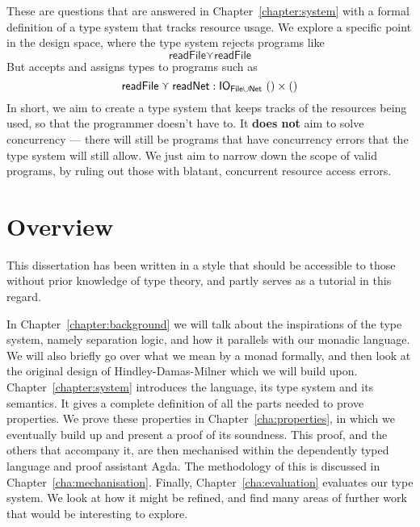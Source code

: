 \documentclass{report}
\begin{document}
These are questions that are answered in Chapter~\ref{chapter:system} with a
formal definition of a type system that tracks resource usage. We explore a
specific point in the design space, where the type system rejects programs like
\[
\textsf{readFile} \curlyvee \textsf{readFile}
\]
But accepts and assigns types to programs such as
\[
\textsf{readFile} \curlyvee \textsf{readNet} : \mathsf{IO}_{\textsf{File} \cup \textsf{Net}} \ () \times ()
\]
In short, we aim to create a type system that keeps tracks of the resources
being used, so that the programmer doesn't have to. It \textbf{does not} aim to
solve concurrency --- there will still be programs that have concurrency errors
that the type system will still allow. We just aim to narrow down the scope of
valid programs, by ruling out those with blatant, concurrent resource access
errors. 

\section{Overview}

This dissertation has been written in a style that should be accessible to those
without prior knowledge of type theory, and partly serves as a tutorial in this
regard.

In Chapter~\ref{chapter:background} we will talk about the inspirations of the
type system, namely separation logic, and how it parallels with our monadic
language. We will also briefly go over what we mean by a monad formally, and
then look at the original design of Hindley-Damas-Milner which we will build
upon.
Chapter~\ref{chapter:system} introduces the language, its type system and its
semantics.  It gives a complete definition of all the parts needed to prove
properties.  We prove these properties in Chapter~\ref{cha:properties}, in which
we eventually build up and present a proof of its soundness. This proof, and the
others that accompany it, are then mechanised within the dependently typed
language and proof assistant Agda. The methodology of this is discussed in
Chapter~\ref{cha:mechanisation}. Finally, Chapter~\ref{cha:evaluation}
evaluates our type system. We look at how it might be refined, and find many
areas of further work that would be interesting to explore.










\end{document}
